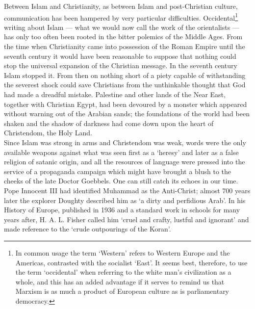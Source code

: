 \documentclass[10pt, twoside]{book}
\begin{document}
Between Islam and Christianity, as between Islam and post\hyp{}Christian culture, communication has been hampered by very particular difficulties. Occidental\footnote{In common usage the term `Western' refers to Western Europe and the Americas, contrasted with the socialist `East'. It seems best, therefore, to use the term `occidental' when referring to the white man's civilization as a whole, and this has an added advantage if it serves to remind us that Marxism is as much a product of European culture as is parliamentary democracy.} writing about Islam --- what we would now call the work of the orientalists --- has only too often been rooted in the bitter polemics of the Middle Ages. From the time when Christianity came into possession of the Roman Empire until the seventh century it would have been reasonable to suppose that nothing could stop the universal expansion of the Christian message. In the seventh century Islam stopped it. From then on nothing short of a piety capable of withstanding the severest shock could save Christians from the unthinkable thought that God had made a dreadful mistake. Palestine and other lands of the Near East, together with Christian Egypt, had been devoured by a monster which appeared without warning out of the Arabian sands; the foundations of the world had been shaken and the shadow of darkness had come down upon the heart of Christendom, the Holy Land. \\

Since Islam was strong in arms and Christendom was weak, words were the only available weapons against what was seen first as a `heresy' and later as a false religion of satanic origin, and all the resources of language were pressed into the service of a propaganda campaign which might have brought a blush to the cheeks of the late Doctor Goebbels. One can still catch its echoes in our time. Pope Innocent III had identified Muhammad as the Anti\hyp{}Christ; almost 700 years later the explorer Doughty described him as `a dirty and perfidious Arab'. In his History of Europe, published in 1936 and a standard work in schools for many years after, H. A. L. Fisher called him `cruel and crafty, lustful and ignorant' and made reference to the `crude outpourings of the Koran'. \\
\end{document}
